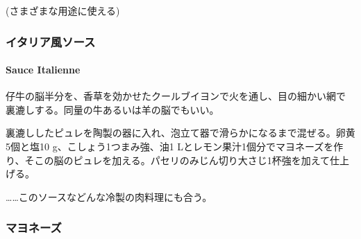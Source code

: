 \begin{recette}
(さまざまな用途に使える)

\maeaki

\hypertarget{ux30a4ux30bfux30eaux30a2ux98a8ux30bdux30fcux30b9}{%
\subsubsection{イタリア風ソース}\label{ux30a4ux30bfux30eaux30a2ux98a8ux30bdux30fcux30b9}}

\hypertarget{sauce-italienne-froide}{%
\paragraph{Sauce Italienne}\label{sauce-italienne-froide}}


仔牛の脳半分を、香草を効かせたクールブイヨンで火を通し、目の細かい網で
裏漉しする。同量の牛あるいは羊の脳でもいい。

裏漉ししたピュレを陶製の器に入れ、泡立て器で滑らかになるまで混ぜる。卵黄5個と塩10
g、こしょう1つまみ強、油1
Lとレモン果汁1個分でマヨネーズを作り、そこの脳のピュレを加える。パセリのみじん切り大さじ1杯強を加えて仕上げる。

\ldots{}\ldots{}このソースなどんな冷製の肉料理にも合う。

\hypertarget{ux30deux30e8ux30cdux30fcux30ba}{%
\subsubsection{マヨネーズ}\label{ux30deux30e8ux30cdux30fcux30ba}}

\hypertarget{mayonnaise}{%
}
\end{recette}
